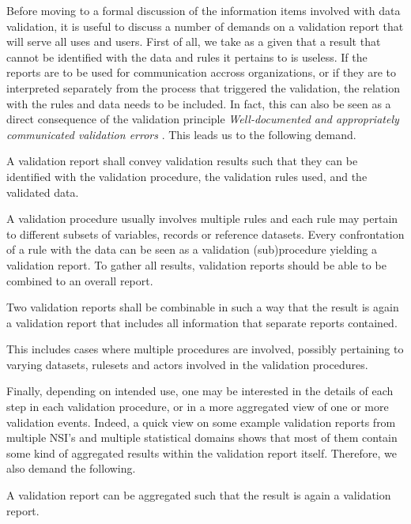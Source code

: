 Before moving to a formal discussion of the information items involved with
data validation, it is useful to discuss a number of demands on a validation
report that will serve all uses and users. First of all, we take as a given
that a result that cannot be identified with the data and rules it pertains to
is useless. If the reports are to be used for communication accross
organizations, or if they are to interpreted separately from the process that
triggered the validation, the relation with the rules and data needs to be
included.  In fact, this can also be seen as a direct consequence of the
validation principle \emph{Well-documented and appropriately communicated
validation errors} \citep{ESS2017}. This leads us to the following demand.

\begin{demand}[Identification]
A validation report shall convey validation results such that they can be
identified with the validation procedure, the validation rules used, and the
validated data.
\label{dem:identify}
\end{demand}


A validation procedure usually involves multiple rules and each rule may
pertain to different subsets of variables, records or reference datasets. Every
confrontation of a rule with the data can be seen as a validation
(sub)procedure yielding a validation report. To gather all results, validation
reports should be able to be combined to an overall report.
%
\begin{demand}
Two validation reports shall be combinable in such a way that the result is
again a validation report that includes all information that separate reports
contained.
\label{dem:combine}
\end{demand}
%
This includes cases where multiple procedures are involved, possibly pertaining
to varying datasets, rulesets and actors involved in the validation procedures. 

Finally, depending on intended use, one may be interested in the details of
each step in each validation procedure, or in a more aggregated view of one or
more validation events. Indeed, a quick view on some example validation reports
from multiple NSI's and multiple statistical domains shows that most of them
contain some kind of aggregated results within the validation report itself.
Therefore, we also demand the following.

\begin{demand}
A validation report can be aggregated such that the result is again a
validation report.
\label{dem:aggregate}
\end{demand}

